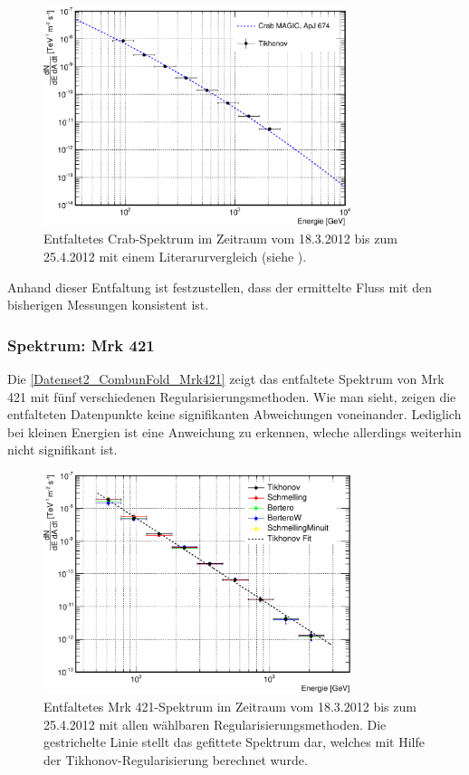 \begin{figure}
    \centering
    \includegraphics[width=0.8\textwidth]{./Plots/04_MrkAnalyse/Datenset2/Crab_mit_Literatur.pdf}
    \caption{Entfaltetes Crab-Spektrum im Zeitraum vom 18.3.2012 bis zum 25.4.2012 mit einem Literarurvergleich (siehe \cite{LiteraturreferenzMAGIC}).}
    \label{Datenset2_CombunFold_Crab}
\end{figure}

Anhand dieser Entfaltung ist festzustellen, dass der ermittelte Fluss mit den bisherigen Messungen konsistent ist.

\subsubsection{Spektrum: Mrk 421}
Die \autoref{Datenset2_CombunFold_Mrk421} zeigt das entfaltete Spektrum von Mrk 421 mit fünf verschiedenen Regularisierungsmethoden.
Wie man sieht, zeigen die entfalteten Datenpunkte keine signifikanten Abweichungen voneinander. 
Lediglich bei kleinen Energien ist eine Anweichung zu erkennen, wleche allerdings weiterhin nicht signifikant ist.

\begin{figure}
    \centering
    \includegraphics[width=0.8\textwidth]{./Plots/04_MrkAnalyse/Datenset2/Spektrum_Mrk421.pdf}
    \caption{Entfaltetes Mrk 421-Spektrum im Zeitraum vom 18.3.2012 bis zum 25.4.2012 mit allen wählbaren Regularisierungsmethoden.
    Die gestrichelte Linie stellt das gefittete Spektrum dar, welches mit Hilfe der Tikhonov-Regularisierung berechnet wurde.}
    \label{Datenset2_CombunFold_Mrk421}
\end{figure}

